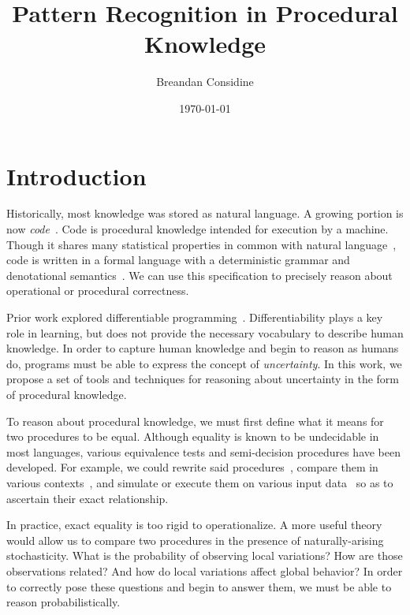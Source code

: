 \documentclass[11pt]{article}
\title{Pattern Recognition in Procedural Knowledge}
\author{Breandan Considine}
\date{\today}
\begin{document}
    \maketitle

    \tableofcontents
    \pagebreak

    \section{Introduction}

    Historically, most knowledge was stored as natural language. A growing portion is now \textit{code}~\citep{allamanis2018survey}. Code is procedural knowledge intended for execution by a machine. Though it shares many statistical properties in common with natural language~\citep{hindle2012naturalness}, code is written in a formal language with a deterministic grammar and denotational semantics~\citep{pierce2010software}. We can use this specification to precisely reason about operational or procedural correctness.

    Prior work explored differentiable programming~\citep{considine2019programming}. Differentiability plays a key role in learning, but does not provide the necessary vocabulary to describe human knowledge. In order to capture human knowledge and begin to reason as humans do, programs must be able to express the concept of \textit{uncertainty}. In this work, we propose a set of tools and techniques for reasoning about uncertainty in the form of procedural knowledge.

    To reason about procedural knowledge, we must first define what it means for two procedures to be equal. Although equality is known to be undecidable in most languages, various equivalence tests and semi-decision procedures have been developed. For example, we could rewrite said procedures~\citep{baader1999term}, compare them in various contexts~\citep{felleisen1990expressive}, and simulate or execute them on various input data~\citep{chen2020metamorphic} so as to ascertain their exact relationship.

    In practice, exact equality is too rigid to operationalize. A more useful theory would allow us to compare two procedures in the presence of naturally-arising stochasticity. What is the probability of observing local variations? How are those observations related? And how do local variations affect global behavior? In order to correctly pose these questions and begin to answer them, we must be able to reason probabilistically.
\end{document}
